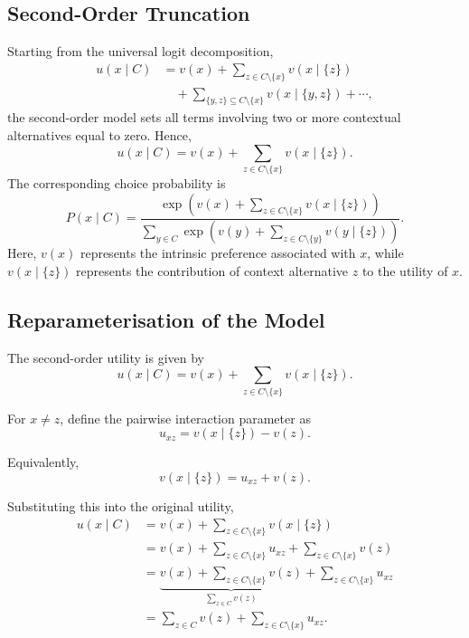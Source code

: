 \documentclass[12pt,oneside]{report}
\begin{document}
\subsection{Second-Order Truncation}
Starting from the universal logit decomposition,
\begin{equation}
\begin{split}
    u(x\mid C)
    &=v(x)
    +\sum_{z\in C\setminus\{x\}}v(x\mid\{z\})\\
    &\quad+
    \sum_{\{y,z\}\subseteq C\setminus\{x\}}v(x\mid\{y,z\})
    +\cdots,
\end{split}
\end{equation}
the second-order model sets all terms involving two or more contextual
alternatives equal to zero. Hence,
\begin{equation}
    u(x\mid C)
    =
    v(x)+\sum_{z\in C\setminus\{x\}}v(x\mid\{z\}).
    \label{eq:second-order-truncation}
\end{equation}
The corresponding choice probability is
\begin{equation}
    P(x\mid C)
    =
    \frac{
        \exp\left(
            v(x)+\displaystyle\sum_{z\in C\setminus\{x\}}
            v(x\mid\{z\})
        \right)
    }{
        \displaystyle\sum_{y\in C}
        \exp\left(
            v(y)+\sum_{z\in C\setminus\{y\}}
            v(y\mid\{z\})
        \right)
    }.
    \label{eq:second-order-choice-probability}
\end{equation}
Here, $v(x)$ represents the intrinsic preference associated with $x$, while
$v(x\mid\{z\})$ represents the contribution of context alternative $z$ to
the utility of $x$.

\subsection{Reparameterisation of the Model}

The second-order utility is given by
\begin{equation}
u(x\mid C)
=
v(x)
+
\sum_{z\in C\setminus\{x\}}
v(x\mid\{z\}).
\end{equation}

For $x\neq z$, define the pairwise interaction parameter as
\begin{equation}
u_{xz}=v(x\mid\{z\})-v(z).
\end{equation}

Equivalently,
\[
v(x\mid\{z\})=u_{xz}+v(z).
\]

Substituting this into the original utility,
\begin{align}
u(x\mid C)
&=
v(x)
+
\sum_{z\in C\setminus\{x\}}
v(x\mid\{z\})
\\[6pt]
&=
v(x)
+
\sum_{z\in C\setminus\{x\}}u_{xz}
+
\sum_{z\in C\setminus\{x\}}v(z)
\\[6pt]
&=
\underbrace{
v(x)+
\sum_{z\in C\setminus\{x\}}v(z)
}_{\displaystyle \sum_{z\in C}v(z)}
+
\sum_{z\in C\setminus\{x\}}u_{xz}
\\[6pt]
&=
\sum_{z\in C}v(z)
+
\sum_{z\in C\setminus\{x\}}u_{xz}.
\end{align}
\end{document}
